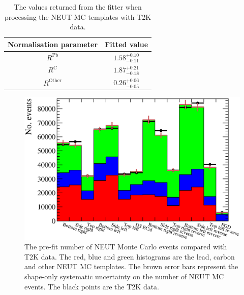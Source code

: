 \begin{table}
  \begin{tabular}{c c }
    Normalisation parameter & Fitted value \\ \hline \hline
    $R^{\textrm{Pb}}$ & $1.58^{+0.10}_{-0.11}$  \\
    $R^{\textrm{C}}$ & $1.87^{+0.21}_{-0.18}$  \\
    $R^{\textrm{Other}}$ & $0.26^{+0.06}_{-0.05}$  \\
  \end{tabular}
  \caption{The values returned from the fitter when processing the NEUT MC templates with T2K data.}
  \label{table:NEUTMCTemplatesT2KDataFitParameters}
\end{table}
\begin{figure}
  \centering
  \includegraphics[width=15cm]{images/measurement/data/MCTemplatesWithSystematics_T2KData_PreFit.eps}
  \caption{The pre-fit number of NEUT Monte Carlo events compared with T2K data.  The red, blue and green histograms are the lead, carbon and other NEUT MC templates.  The brown error bars represent the shape-only systematic uncertainty on the number of NEUT MC events.  The black points are the T2K data.}
  \label{fig:MCTemplatesWithSystematicsT2KDataPreFit}
\end{figure}
